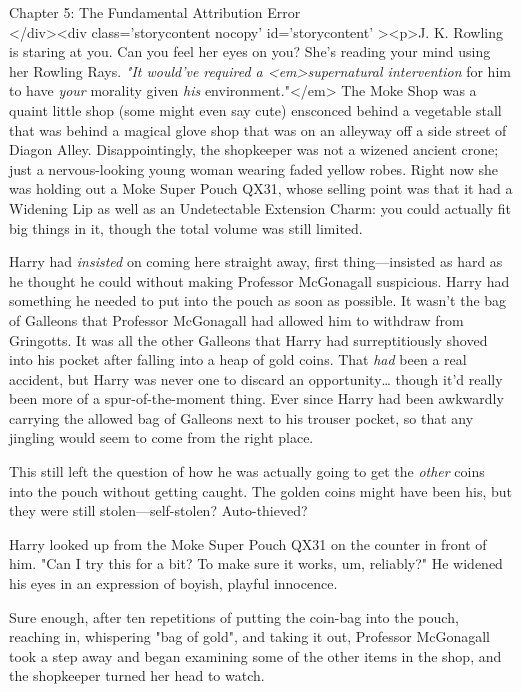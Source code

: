 
Chapter 5: The Fundamental Attribution Error\\
</div><div  class='storycontent nocopy' id='storycontent' ><p>J. K. Rowling is 
staring at you. Can you feel her eyes on you? She's reading your mind using her 
Rowling Rays.
\sbreak
\emph{"It would've required a <em>supernatural intervention} for him to have 
\emph{your} morality given \emph{his} environment."</em>
\sbreak
The Moke Shop was a quaint little shop (some might even say cute) ensconced 
behind a vegetable stall that was behind a magical glove shop that was on an 
alleyway off a side street of Diagon Alley. Disappointingly, the shopkeeper was 
not a wizened ancient crone; just a nervous-looking young woman wearing faded 
yellow robes. Right now she was holding out a Moke Super Pouch QX31, whose 
selling point was that it had a Widening Lip as well as an Undetectable 
Extension Charm: you could actually fit big things in it, though the total 
volume was still limited.

Harry had \emph{insisted} on coming here straight away, first thing---insisted 
as hard as he thought he could without making Professor McGonagall suspicious. 
Harry had something he needed to put into the pouch as soon as possible. It 
wasn't the bag of Galleons that Professor McGonagall had allowed him to 
withdraw from Gringotts. It was all the other Galleons that Harry had 
surreptitiously shoved into his pocket after falling into a heap of gold coins. 
That \emph{had} been a real accident, but Harry was never one to discard an 
opportunity{\ldots} though it'd really been more of a spur-of-the-moment thing. 
Ever since Harry had been awkwardly carrying the allowed bag of Galleons next 
to his trouser pocket, so that any jingling would seem to come from the right 
place.

This still left the question of how he was actually going to get the 
\emph{other} coins into the pouch without getting caught. The golden coins 
might have been his, but they were still stolen---self-stolen? Auto-thieved?

Harry looked up from the Moke Super Pouch QX31 on the counter in front of him. 
"Can I try this for a bit? To make sure it works, um, reliably?" He widened his 
eyes in an expression of boyish, playful innocence.

Sure enough, after ten repetitions of putting the coin-bag into the pouch, 
reaching in, whispering "bag of gold", and taking it out, Professor McGonagall 
took a step away and began examining some of the other items in the shop, and 
the shopkeeper turned her head to watch.

